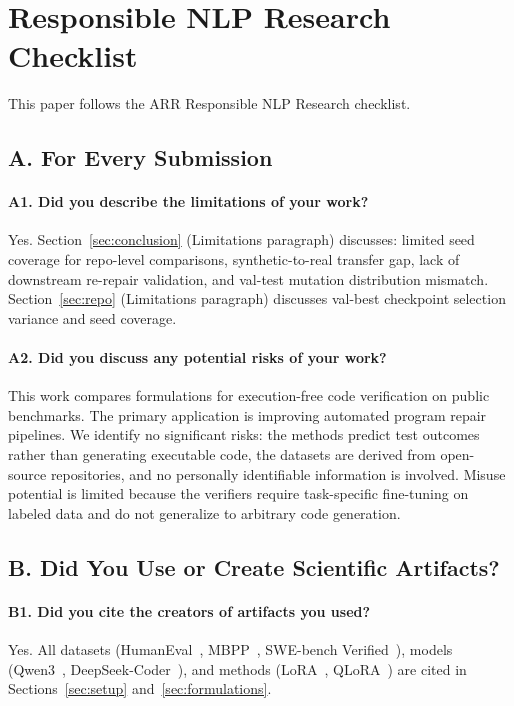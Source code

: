 
\section*{Responsible NLP Research Checklist}

This paper follows the ARR Responsible NLP Research checklist.

\subsection*{A. For Every Submission}

\paragraph{A1. Did you describe the limitations of your work?}
Yes. Section~\ref{sec:conclusion} (Limitations paragraph) discusses: limited seed coverage for repo-level comparisons, synthetic-to-real transfer gap, lack of downstream re-repair validation, and val-test mutation distribution mismatch. Section~\ref{sec:repo} (Limitations paragraph) discusses val-best checkpoint selection variance and seed coverage.

\paragraph{A2. Did you discuss any potential risks of your work?}
This work compares formulations for execution-free code verification on public benchmarks. The primary application is improving automated program repair pipelines. We identify no significant risks: the methods predict test outcomes rather than generating executable code, the datasets are derived from open-source repositories, and no personally identifiable information is involved. Misuse potential is limited because the verifiers require task-specific fine-tuning on labeled data and do not generalize to arbitrary code generation.

\subsection*{B. Did You Use or Create Scientific Artifacts?}

\paragraph{B1. Did you cite the creators of artifacts you used?}
Yes. All datasets (HumanEval~\cite{chen2021humaneval}, MBPP~\cite{austin2021mbpp}, SWE-bench Verified~\cite{chowdhury2024swebenchverified}), models (Qwen3~\cite{qwen2025qwen3}, DeepSeek-Coder~\cite{guo2024deepseekcoder}), and methods (LoRA~\cite{hu2022lora}, QLoRA~\cite{dettmers2024qlora}) are cited in Sections~\ref{sec:setup} and~\ref{sec:formulations}.

